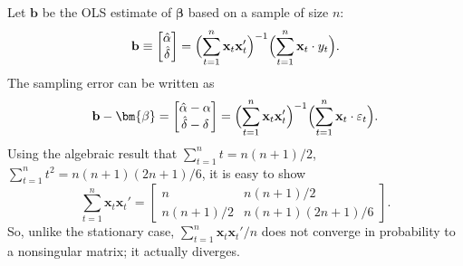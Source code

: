 Let $\mathbf{b}$ be the OLS estimate of $\bm{\beta}$ based on a sample of size $n$:
%
\begin{equation}
\mathbf{b} \equiv \begin{bmatrix} \hat{\alpha} \\ \hat{\delta} \end{bmatrix}
= \Bigl(\sum_{t=1}^{n}\mathbf{x}_t\mathbf{x}_t'\Bigr)^{-1}
\Bigl(\sum_{t=1}^{n}\mathbf{x}_t \cdot y_t\Bigr).
\label{eq:2.12.3}
\end{equation}
%
The sampling error can be written as
%
\begin{equation}
\mathbf{b} - \bm{\beta}
= \begin{bmatrix} \hat{\alpha} - \alpha \\ \hat{\delta} - \delta \end{bmatrix}
= \Bigl(\sum_{t=1}^{n}\mathbf{x}_t\mathbf{x}_t'\Bigr)^{-1}
\Bigl(\sum_{t=1}^{n}\mathbf{x}_t \cdot \varepsilon_t\Bigr).
\label{eq:2.12.4}
\end{equation}
%
Using the algebraic result that $\sum_{t=1}^{n} t = n(n+1)/2$,
$\sum_{t=1}^{n} t^2 = n(n+1)(2n+1)/6$, it is easy to show
%
\begin{equation}
\sum_{t=1}^{n}\mathbf{x}_t\mathbf{x}_t'
= \begin{bmatrix}
n & n(n+1)/2 \\
n(n+1)/2 & n(n+1)(2n+1)/6
\end{bmatrix}.
\label{eq:2.12.5}
\end{equation}
%
So, unlike the stationary case, $\sum_{t=1}^{n}\mathbf{x}_t\mathbf{x}_t'/n$ does not converge in probability to
a nonsingular matrix; it actually diverges.

